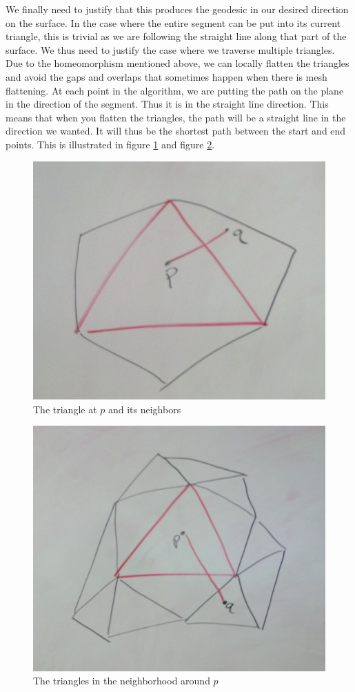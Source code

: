 \documentclass[conference]{acmsiggraph}
\begin{document}
We finally need to justify that this produces the geodesic in our desired direction on the surface. In the case where the entire segment can be put into its current triangle, this is trivial as we are following the straight line along that part of the surface. We thus need to justify the case where we traverse multiple triangles. Due to the homeomorphism mentioned above, we can locally flatten the triangles and avoid the gaps and overlaps that sometimes happen when there is mesh flattening. At each point in the algorithm, we are putting the path on the plane in the direction of the segment. Thus it is in the straight line direction. This means that when you flatten the triangles, the path will be a straight line in the direction we wanted. It will thus be the shortest path between the start and end points. This is illustrated in figure \ref{flatteningDiagram_oneTriangle} and figure \ref{flatteningDiagram_neighborhood}. 
\begin{figure}[ht]
\centering
\includegraphics[width=\columnwidth]{flatteningdiagram_oneTriangleAndNeighbors.jpg}
\caption{The triangle at $p$ and its neighbors}
\label{flatteningDiagram_oneTriangle}
\end{figure}
\begin{figure}[ht]
\centering
\includegraphics[width=\columnwidth]{flatteningdiagram_neighborhood.jpg}
\caption{The triangles in the neighborhood around $p$}
\label{flatteningDiagram_neighborhood}
\end{figure}






\end{document}

